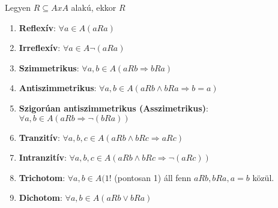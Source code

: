 \documentclass{beamer}
\begin{document}
\begin{frame}
\begin{tcolorbox}[title={Def.: Homogén binér relációk tulajdonságai}]
Legyen $R \subseteq A x A$ alakú, ekkor $R$\\
\begin{enumerate}
\item \textbf{Reflexív}: ${\forall}a \in A (a R a)$
\item \textbf{Irreflexív}: ${\forall}a \in A {\neg}(a R a)$
\item \textbf{Szimmetrikus}: ${\forall}a, b \in A (a R b \Rightarrow b R a)$
\item \textbf{Antiszimmetrikus}: ${\forall}a, b \in A (a R b \land b R a \Rightarrow b = a)$
\item \textbf{Szigorúan antiszimmetrikus (Asszimetrikus)}: ${\forall}a, b \in A (a R b \Rightarrow {\neg}(b R a))$
\item \textbf{Tranzitív}: ${\forall}a, b, c \in A (a R b \land b R c \Rightarrow a R c)$
\item \textbf{Intranzitív}: ${\forall}a, b, c \in A (a R b \land b R c \Rightarrow {\neg}(a R c))$
\item \textbf{Trichotom}: ${\forall}a, b \in A (1!$ (pontosan 1) áll fenn $a R b, b R a, a = b$ közül.
\item \textbf{Dichotom}: ${\forall}a, b \in A (a R b \lor b R a)$
\end{enumerate}
\end{tcolorbox}
\end{frame}
\end{document}
